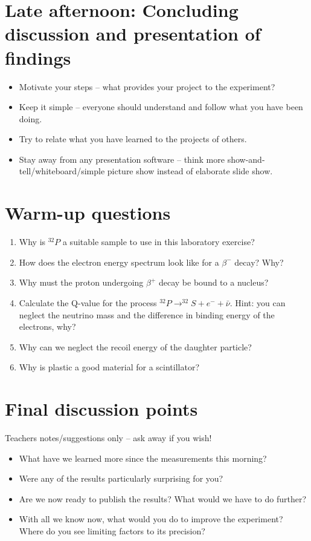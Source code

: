 \documentclass[a4,11pt, notitlepage]{article}
\begin{document}
\section{Late afternoon: Concluding discussion and presentation of findings}
\label{sec:final-presentation}

\begin{itemize}
\item Motivate your steps -- what provides your project to the experiment?
\item Keep it simple -- everyone should understand and follow what you
  have been doing.
\item Try to relate what you have learned to the projects of
  others.
\item Stay away from any presentation software -- think more
  show-and-tell/whiteboard/simple picture show instead of elaborate slide show.

\end{itemize}

\appendix
\section{Warm-up questions}

\begin{enumerate}
\item Why is $^{32}P$ a suitable sample to use in this laboratory exercise?
\item How does the electron energy spectrum look like for a $\beta^-$ decay? Why? 
\item Why must the proton undergoing $\beta^+$ decay be bound to a nucleus?
\item Calculate the Q-value for the process $^{32}P\rightarrow ^{32}S + e^- + \bar{\nu}$. Hint: you can neglect the neutrino mass and the difference in binding energy of the electrons, why? 
\item Why can we neglect the recoil energy of the daughter particle? 
\item Why is plastic a good material for a scintillator?
\end{enumerate}


\section{Final discussion points}
\label{sec:further-discussion}

Teachers notes/suggestions only -- ask away if you wish!

\begin{itemize}
\item What have we learned more since the measurements this morning?
\item Were any of the results particularly surprising for you?
\item Are we now ready to publish the results? What would we have to
  do further?
\item With all we know now, what would you do to improve the
  experiment? Where do you see limiting factors to its precision?
\end{itemize}
\end{document}
